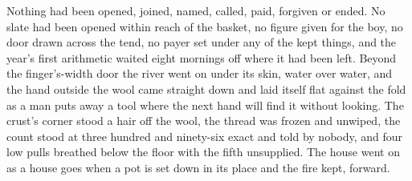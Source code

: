 Nothing had been opened, joined, named, called, paid, forgiven or ended. No slate had been opened within reach of the basket, no figure given for the boy, no door drawn across the tend, no payer set under any of the kept things, and the year's first arithmetic waited eight mornings off where it had been left. Beyond the finger's-width door the river went on under its skin, water over water, and the hand outside the wool came straight down and laid itself flat against the fold as a man puts away a tool where the next hand will find it without looking. The crust's corner stood a hair off the wool, the thread was frozen and unwiped, the count stood at three hundred and ninety-six exact and told by nobody, and four low pulls breathed below the floor with the fifth unsupplied. The house went on as a house goes when a pot is set down in its place and the fire kept, forward.
